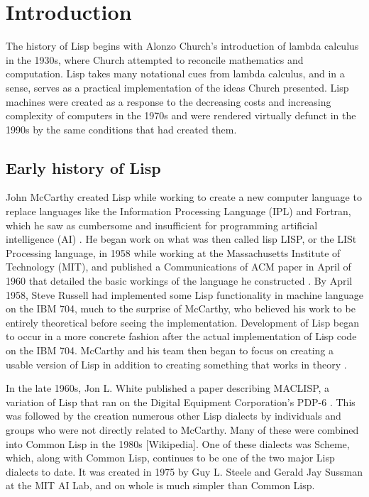 \documentclass[journal]{IEEEtran}
\begin{document}
%
\IEEEpeerreviewmaketitle



\section{Introduction}
The history of Lisp begins with Alonzo Church's introduction of lambda calculus in the 1930s, where Church attempted to reconcile mathematics and computation. Lisp takes many notational cues from lambda calculus, and in a sense, serves as a practical implementation of the ideas Church presented. Lisp machines were created as a response to the decreasing costs and increasing complexity of computers in the 1970s and were rendered virtually defunct in the 1990s by the same conditions that had created them. 

\subsection{Early history of Lisp}
John McCarthy created Lisp while working to create a new computer language to replace languages like the Information Processing Language (IPL) and Fortran, which he saw as cumbersome and insufficient for programming artificial intelligence (AI) \cite{stoyan}. He began work on what was then called lisp LISP, or the LISt Processing language, in 1958 while working at the Massachusetts Institute of Technology (MIT), and published a Communications of ACM paper in April of 1960 that detailed the basic workings of the language he constructed \cite{stoyan, mccarthy}. By April 1958, Steve Russell had implemented some Lisp functionality in machine language on the IBM 704, much to the surprise of McCarthy, who believed his work to be entirely theoretical before seeing the implementation. Development of Lisp began to occur in a more concrete fashion after the actual implementation of Lisp code on the IBM 704. McCarthy and his team then began to focus on creating a usable version of Lisp in addition to creating something that works in theory \cite{stoyan}.

In the late 1960s, Jon L. White published a paper describing MACLISP, a variation of Lisp that ran on the Digital Equipment Corporation's PDP-6 \cite{stoyan}. This was followed by the creation numerous other Lisp dialects by individuals and groups who were not directly related to McCarthy. Many of these were combined into Common Lisp in the 1980s [Wikipedia]. One of these dialects was Scheme, which, along with Common Lisp, continues to be one of the two major Lisp dialects to date. It was created in 1975 by  Guy L. Steele and Gerald Jay Sussman at the MIT AI Lab, and on whole is much simpler than Common Lisp.
\end{document}

